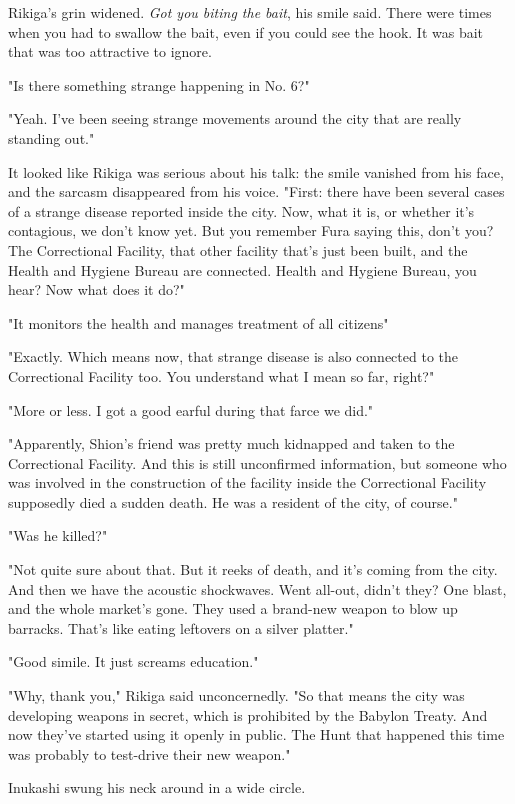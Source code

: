 Rikiga's grin widened. \emph{Got you biting the bait}, his smile said. There
were times when you had to swallow the bait, even if you could see the
hook. It was bait that was too attractive to ignore.

"Is there something strange happening in No. 6?"

"Yeah. I've been seeing strange movements around the city that are
really standing out."

It looked like Rikiga was serious about his talk: the smile vanished
from his face, and the sarcasm disappeared from his voice. "First: there
have been several cases of a strange disease reported inside the city.
Now, what it is, or whether it's contagious, we don't know yet. But you
remember Fura saying this, don't you? The Correctional Facility, that
other facility that's just been built, and the Health and Hygiene Bureau
are connected. Health and Hygiene Bureau, you hear? Now what does it
do?"

"It monitors the health and manages treatment of all citizens\el "

"Exactly. Which means now, that strange disease is also connected to the
Correctional Facility too. You understand what I mean so far, right?"

"More or less. I got a good earful during that farce we did."

"Apparently, Shion's friend was pretty much kidnapped and taken to the
Correctional Facility. And this is still unconfirmed information, but\el 
someone who was involved in the construction of the facility inside the
Correctional Facility supposedly died a sudden death. He was a resident
of the city, of course."

"Was he killed?"

"Not quite sure about that. But it reeks of death, and it's coming from
the city. And then we have the acoustic shockwaves. Went all-out, didn't
they? One blast, and the whole market's gone. They used a brand-new
weapon to blow up barracks. That's like eating leftovers on a silver
platter."

"Good simile. It just screams education."

"Why, thank you," Rikiga said unconcernedly. "So that means the city was
developing weapons in secret, which is prohibited by the Babylon Treaty.
And now they've started using it openly in public. The Hunt that
happened this time was probably to test-drive their new weapon."

Inukashi swung his neck around in a wide circle.

